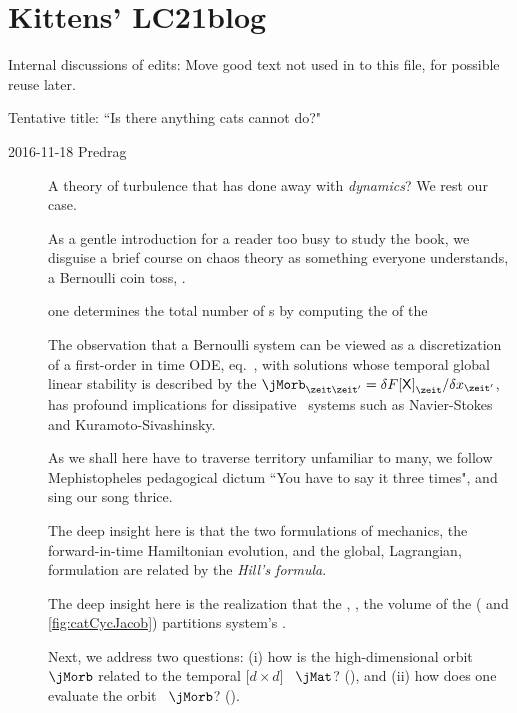 
\section{Kittens' LC21blog}
\label{s:CL18blog}

Internal discussions of  edits:
Move good text not used in  to this file, for possible
reuse later.

\bigskip

Tentative title:    ``Is there anything cats cannot do?"

\begin{description}

\item[2016-11-18 Predrag]
A theory of turbulence that has done away with \emph{dynamics}?
We rest our case.

As a gentle introduction
for a reader too busy to study the book,
we
disguise a brief course on chaos theory as something everyone
understands, a Bernoulli coin toss, .

one determines the total number of
{\lattstate}s by computing the {\HillDet}  of the
\emph{\jacobianOrb}

The observation that a Bernoulli system can be viewed as a discretization
of a first-order in time ODE, eq.~, with solutions
whose temporal global linear stability is described by the {\jacobianOrb}
$\jMorb_{\zeit\zeit'}=\delta{F[\Xx]}_{\zeit}/\delta\ssp_{\zeit'}$, has
profound implications for dissipative \spt\ systems such as Navier-Stokes
and Kuramoto-Sivashinsky.

As we shall here have to traverse territory unfamiliar to many, we
follow Mephistopheles pedagogical dictum ``You have to say it three
times", and sing our song thrice.

The deep insight here is that the two formulations of mechanics, the
for\-ward-in-time Hamiltonian evolution, and the global, Lagrangian,
{\templatt} formulation are related by the {\em Hill's formula}.

The deep insight
here is the realization that the {\em\HillDet}, \ie, the volume of the
{\em\jacobianOrb} ( and \ref{fig:catCycJacob})
partitions system's \statesp.

Next, we address two questions:
(i) how is the high-dimensional orbit \jacobianOrb\ $\jMorb$ related
to the temporal [$d\!\times\!d$] \jacobianM\ $\jMat$?
(),
and
(ii) how does one evaluate the orbit \jacobianM\ $\jMorb$?
().


\end{description}
